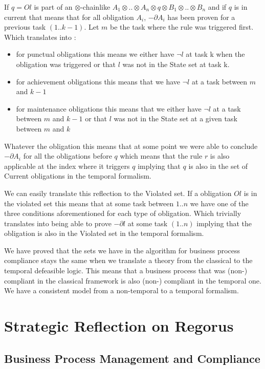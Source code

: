 \documentclass[10pt]{report}
\newcommand{\ochain}{$\otimes$-chain}
\begin{document}
If $q=Ol$ is part of an \ochain like $A_{1}\otimes .. \otimes A_{n} \otimes q \otimes B_{1} \otimes .. \otimes B_{n}$ and if $q$ is in current that means that for all obligation $A_{i}$, $-\partial A_{i}$ has been proven for a previous task $(1..k-1)$. Let $m$ be the task where the rule was triggered first. Which translates into :
\begin{itemize}
\item for punctual obligations this means we either have $\neg l$ at task k when the obligation was triggered or that $l$ was not in the State set at task k.
\item for achievement obligations this means that we have $\neg l$ at a task between $m$ and $k-1$
\item for maintenance obligations this means that we either have $\neg l$ at a task between $m$ and $k-1$ or that $l$ was not in the State set at a given task between $m$ and $k$ 
\end{itemize}

Whatever the obligation this means that at some point we were able to conclude $-\partial A_{i}$ for all the obligations before $q$ which means that the rule $r$ is also applicable at the index where it triggers $q$ implying that $q$ is also in the set of Current obligations in the temporal formalism.

We can easily translate this reflection to the Violated set. If a obligation $Ol$ is in the violated set this means that at some task between $1..n$ we have one of the three conditions aforementioned for each type of obligation. Which trivially translates into being able to prove $-\partial l$ at some task $(1..n)$ implying that the obligation is also in the Violated set in the temporal formalism.

We have proved that the sets we have in the algorithm for business process compliance stays the same when we translate a theory from the classical to the temporal defeasible logic. This means that a business process that was (non-) compliant in the classical framework is also (non-) compliant in the temporal one. We have a consistent model from a non-temporal to a temporal formalism.

\newpage
{}
\chapter{ Strategic Reflection on Regorus}

\section{Business Process Management and Compliance}
\end{document}

